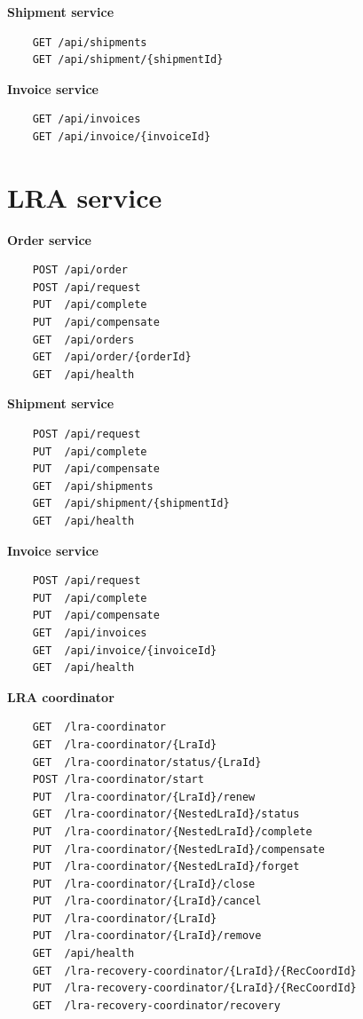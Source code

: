 \documentclass[oneside,
  digital, %
  table,   %
  lof,     %
  lot,     %
]{fithesis3}
\begin{document}
\noindent
\textbf{Shipment service}

\begin{verbatim}
    GET /api/shipments
    GET /api/shipment/{shipmentId}
\end{verbatim}

\noindent
\textbf{Invoice service}

\begin{verbatim}
    GET /api/invoices
    GET /api/invoice/{invoiceId}
\end{verbatim}

\section{LRA service}

\textbf{Order service}

\begin{verbatim}
    POST /api/order
    POST /api/request
    PUT  /api/complete
    PUT  /api/compensate
    GET  /api/orders
    GET  /api/order/{orderId}
    GET  /api/health
\end{verbatim}

\noindent
\textbf{Shipment service}

\begin{verbatim}
    POST /api/request
    PUT  /api/complete
    PUT  /api/compensate
    GET  /api/shipments
    GET  /api/shipment/{shipmentId}
    GET  /api/health
\end{verbatim}

\noindent
\textbf{Invoice service}

\begin{verbatim}
    POST /api/request
    PUT  /api/complete
    PUT  /api/compensate
    GET  /api/invoices
    GET  /api/invoice/{invoiceId}
    GET  /api/health
\end{verbatim}

\noindent
\textbf{LRA coordinator}

\begin{verbatim}
    GET  /lra-coordinator
    GET  /lra-coordinator/{LraId}
    GET  /lra-coordinator/status/{LraId}
    POST /lra-coordinator/start
    PUT  /lra-coordinator/{LraId}/renew
    GET  /lra-coordinator/{NestedLraId}/status
    PUT  /lra-coordinator/{NestedLraId}/complete
    PUT  /lra-coordinator/{NestedLraId}/compensate
    PUT  /lra-coordinator/{NestedLraId}/forget
    PUT  /lra-coordinator/{LraId}/close
    PUT  /lra-coordinator/{LraId}/cancel
    PUT  /lra-coordinator/{LraId}
    PUT  /lra-coordinator/{LraId}/remove
    GET  /api/health
    GET  /lra-recovery-coordinator/{LraId}/{RecCoordId}
    PUT  /lra-recovery-coordinator/{LraId}/{RecCoordId}
    GET  /lra-recovery-coordinator/recovery
\end{verbatim}
\end{document}
